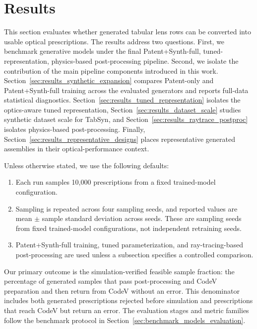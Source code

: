 \section{Results}

This section evaluates whether generated tabular lens rows can be converted into usable optical prescriptions. The results address two questions. First, we benchmark generative models under the final Patent+Synth-full, tuned-representation, physics-based post-processing pipeline. Second, we isolate the contribution of the main pipeline components introduced in this work. Section~\ref{sec:results_synthetic_expansion} compares Patent-only and Patent+Synth-full training across the evaluated generators and reports full-data statistical diagnostics. Section~\ref{sec:results_tuned_representation} isolates the optics-aware tuned representation, Section~\ref{sec:results_dataset_scale} studies synthetic dataset scale for TabSyn, and Section~\ref{sec:results_raytrace_postproc} isolates physics-based post-processing. Finally, Section~\ref{sec:results_representative_designs} places representative generated assemblies in their optical-performance context.

Unless otherwise stated, we use the following defaults:
\begin{enumerate}
    \item Each run samples 10{,}000 prescriptions from a fixed trained-model configuration.
    \item Sampling is repeated across four sampling seeds, and reported values are mean \ensuremath{\pm} sample standard deviation across seeds. These are sampling seeds from fixed trained-model configurations, not independent retraining seeds.
    \item Patent+Synth-full training, tuned parameterization, and ray-tracing-based post-processing are used unless a subsection specifies a controlled comparison.
\end{enumerate}

Our primary outcome is the simulation-verified feasible sample fraction: the percentage of generated samples that pass post-processing and CodeV preparation and then return from CodeV without an error. This denominator includes both generated prescriptions rejected before simulation and prescriptions that reach CodeV but return an error. The evaluation stages and metric families follow the benchmark protocol in Section~\ref{sec:benchmark_models_evaluation}.

